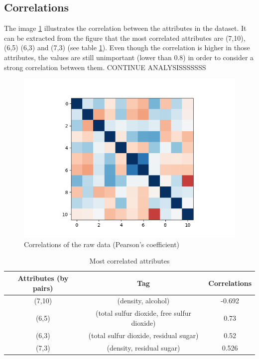 \documentclass[twoside,a4paper,12pt]{report}
\begin{document}
\subsection{Correlations}

The image \ref{CorrelationRaw} illustrates the correlation between the attributes in the dataset. 
It can be extracted from the figure that the most correlated attributes are (7,10), (6,5) (6,3) and 
(7,3) (see table \ref{ResumeCorrelation}).  Even though the correlation is higher in those attributes,
 the values are still unimportant (lower than 0.8) in order to consider a strong correlation between them.
  CONTINUE ANALYSISSSSSSS



\begin{figure}
    \centering
    \includegraphics[width=1\textwidth,height=0.5\textheight]{correlation_no_transformation.png}
    \caption{Correlations of the raw data (Pearson's coefficient)}
     \label{CorrelationRaw} 
\end{figure}

\begin{table}
    \centering
    \begin{tabular}{|| c|c|c||}
          \hline \hline
         Attributes (by pairs) & Tag & Correlations  \\
         \hline \hline
         (7,10) & (density, alcohol) & -0.692\\
         \hline
         (6,5) & (total sulfur dioxide, free sulfur dioxide) & 0.73  \\
         \hline
         (6,3) & (total sulfur dioxide, residual sugar) & 0.52 \\
         \hline
         (7,3) & (density, residual sugar) &0.526 \\
         \hline  \hline
    \end{tabular}
    \caption{Most correlated attributes}
    \label{ResumeCorrelation}
\end{table}
\end{document}
